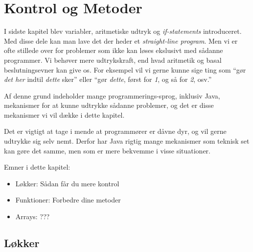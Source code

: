 

\chapter{Kontrol og Metoder}





	I sidste kapitel blev variabler, aritmetiske udtryk og \emph{if-statements}
	introduceret. Med disse dele kan man lave det der heder et
	\emph{straight-line program}. Men vi er ofte stillede over for problemer som
	ikke kan løses ekslusivt med sådanne programmer. Vi behøver mere
	udtrykskraft, end hvad aritmetik og basal beslutningsevner kan give os.
	For eksempel vil vi gerne kunne sige ting som ``gør \emph{det her} indtil
	\emph{dette} sker'' eller ``gør \emph{dette}, først for \emph{1}, og så for
	\emph{2}, osv.''

	Af denne grund indeholder mange programmerings-sprog, inklusiv Java,
	mekanismer for at kunne udtrykke sådanne problemer, og det er disse
	mekanismer vi vil dække i dette kapitel.

	Det er vigtigt at tage i mende at programmører er dåvne dyr, og vil gerne
	udtrykke sig selv nemt. Derfor har Java rigtig mange mekanismer som teknisk
	set kan gøre det samme, men som er mere bekvemme i visse situationer.

	Emner i dette kapitel:

	\begin{itemize} %
		\item Løkker: Sådan får du mere kontrol
		\item Funktioner: Forbedre dine metoder
		\item Arrays: ???
	\end{itemize}

\section{Løkker}

